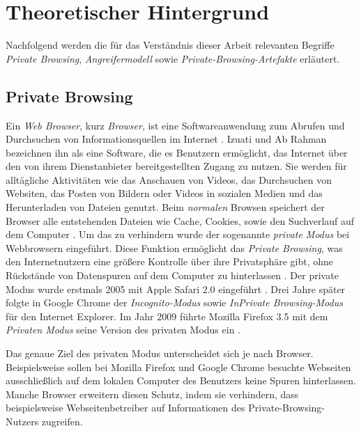 \chapter{Theoretischer Hintergrund}\label{chap:theorie}

Nachfolgend werden die für das Verständnis dieser Arbeit relevanten Begriffe \textit{Private Browsing}, \textit{Angreifermodell} sowie \textit{Private-Browsing-Artefakte} erläutert.

\section{Private Browsing}\label{chap:theorie-private-browsing}

Ein \textit{Web Browser}, kurz \textit{Browser}, ist eine Softwareanwendung zum Abrufen und Durchsuchen von Informationsquellen im Internet \cite{Rochmadi.2017}. Izuati und Ab Rahman \cite{Izzati.2022} bezeichnen ihn als eine Software, die es Benutzern ermöglicht, das Internet über den von ihrem Dienstanbieter bereitgestellten Zugang zu nutzen. Sie werden für alltägliche Aktivitäten wie das Anschauen von Videos, das Durchsuchen von Websiten, das Posten von Bildern oder Videos in sozialen Medien und das Herunterladen von Dateien genutzt. \cite{Izzati.2022}
Beim \textit{normalen} Browsen speichert der Browser alle entstehenden Dateien wie Cache, Cookies, sowie den Suchverlauf auf dem Computer \cite{Izzati.2022}. Um das zu verhindern wurde der sogenannte \textit{private Modus} bei Webbrowsern eingeführt. Diese Funktion ermöglicht das \textit{Private Browsing}, was den Internetnutzern eine größere Kontrolle über ihre Privatsphäre gibt, ohne Rückstände von Datenspuren auf dem Computer zu hinterlassen \cite{Said.2011}. Der private Modus wurde erstmals 2005 mit Apple Safari 2.0 eingeführt \cite{Said.2011}. Drei Jahre später folgte in Google Chrome der \textit{Incognito-Modus} sowie \textit{InPrivate Browsing-Modus} für den Internet Explorer. Im Jahr 2009 führte Mozilla Firefox 3.5 mit dem \textit{Privaten Modus} seine Version des privaten Modus ein \cite{Montasari.2015}.

Das genaue Ziel des privaten Modus unterscheidet sich je nach Browser. Beispielsweise sollen bei Mozilla Firefox und Google Chrome besuchte Webseiten ausschließlich auf dem lokalen Computer des Benutzers keine Spuren hinterlassen. \cite{MozillaWiki.05.06.2023,GoogleChrome.} Manche Browser erweitern diesen Schutz, indem sie verhindern, dass beispielsweise Webseitenbetreiber auf Informationen des Private-Browsing-Nutzers zugreifen. \cite{Tor.24.05.2023}

